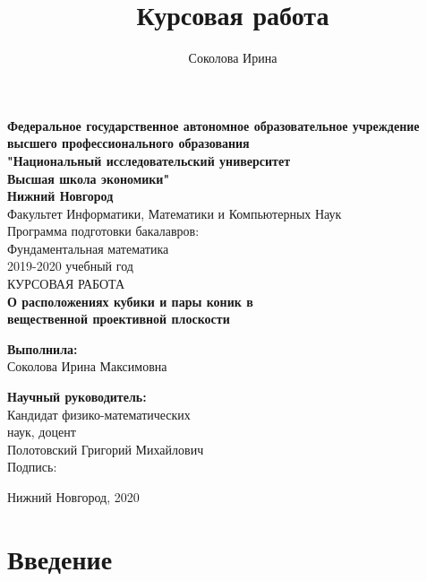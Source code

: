 \documentclass[11pt]{article}
\title{Курсовая работа}
\author{Соколова Ирина}
\begin{document}
\pagestyle{plain}
\makeatletter

\begin{titlepage}
\begin{center}
\textbf{Федеральное государственное автономное образовательное учреждение}\\
\textbf{высшего профессионального образования}\\
\textbf{"Национальный исследовательский университет}\\
\textbf{Высшая школа экономики"}\\
\textbf{Нижний Новгород}\\
\bigskip
\bigskip
\normalsize{Факультет Информатики,  Математики и Компьютерных Наук}\\
\normalsize{Программа подготовки бакалавров:}\\
\normalsize{ Фундаментальная математика}\\
\normalsize{ 2019-2020 учебный год}\\
\bigskip
\footnotesize\uppercase{курсовая работа}\\
\bigskip
\textbf{\large{О расположениях кубики и пары коник в}}\\
\textbf{\large{вещественной проективной плоскости}}\\
\end{center}
\bigskip
\bigskip
\bigskip
\begin{flushright}
\textbf{Выполнила:}\\
\normalsize{Соколова Ирина Максимовна}\\
\end{flushright}
\begin{flushleft}
\textbf{Научный руководитель:}\\
\normalsize{Кандидат физико-математических}\\
\normalsize{наук, доцент}\\
\normalsize{Полотовский Григорий Михайлович}\\
\normalsize{Подпись:}
\bigskip
\bigskip
\end{flushleft}
\vfill
\begin{center} Нижний Новгород, 2020 \end{center}
\end{titlepage}

\tableofcontents

\newpage
\section{Введение}
\end{document}
